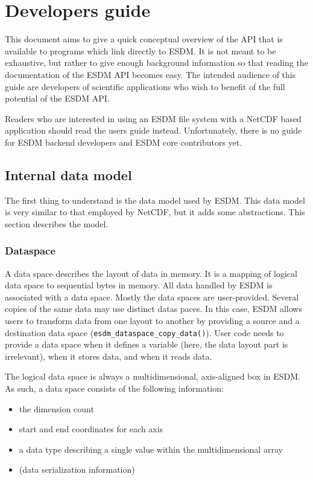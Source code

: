 \section{Developers guide}
This document aims to give a quick conceptual overview of the API that is available to programs which link directly to ESDM. 
It is not meant to be exhaustive, but rather to give enough background information so that reading the documentation of the ESDM API becomes easy. 
The intended audience of this guide are developers of scientific applications who wish to benefit of the full potential of the ESDM API.

Readers who are interested in using an ESDM file system with a NetCDF based application should read the users guide instead. 
Unfortunately, there is no guide for ESDM backend developers and ESDM core contributors yet.

\subsection{Internal data model}

The first thing to understand is the data model used by ESDM.
This data model is very similar to that employed by NetCDF, but it adds some abstractions.
This section describes the model.

\subsubsection{Dataspace}
\label{sec:user-guides:data-space}

A data space describes the layout of data in memory.
It is a mapping of logical data space to sequential bytes in memory.
All data handled by ESDM is associated with a data space.
Mostly the data spaces are user-provided. 
Several copies of the same data may use distinct datas paces.
In this case, ESDM allows users to transform data from one layout to another by providing a source and a destination data space (\lstinline|esdm_dataspace_copy_data()|). 
User code needs to provide a data space when it defines a variable (here, the data layout part is irrelevant), when it stores data, and when it reads data.

The logical data space is always a multidimensional, axis-aligned box in ESDM. 
As such, a data space consists of the following information:

\begin{itemize}
  \item the dimension count
  \item start and end coordinates for each axis
  \item a data type describing a single value within the multidimensional array
  \item (data serialization information)
\end{itemize}

